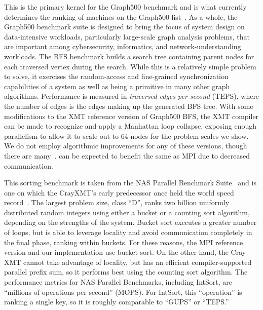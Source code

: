 \vspace{0.5ex}
 This is the primary kernel for the
Graph500 benchmark and is what currently determines the ranking of machines on
the Graph500 list~\cite{graph500list}. As a whole, the Graph500 benchmark
suite is designed to bring the focus of system design on data-intensive
workloads, particularly large-scale graph analysis problems, that are
important among cybersecurity, informatics, and network-understanding
workloads. The BFS benchmark builds a search tree containing parent nodes for
each traversed vertex during the search. While this is a relatively simple
problem to solve, it exercises the random-access and fine-grained
synchronization capabilities of a system as well as being a primitive in many
other graph algorithms. Performance is measured in \emph{traversed edges per
second\/} (TEPS), where the number of edges is the edges making up the
generated BFS tree. With some modifications to the XMT reference version of Graph500 BFS,
the XMT compiler can be made to recognize and apply a Manhattan loop collapse, exposing enough parallelism to allow it to scale out to 64 nodes for the problem scales we show.
We do not employ algorithmic improvements for any of these versions, though there are
many~\cite{Beamer:Graph500,Yoo:FixedPointGraph500}. \Grappa can be expected to benefit the same as MPI due to decreased communication.

\vspace{0.5ex}
 This sorting benchmark is taken from the NAS Parallel Benchmark Suite~\cite{Bailey91thenas,nas3.3} and is one on which the CrayXMT's early predecessor once held the world speed record~\cite{TeraRecord}. The largest problem size, class ``D'', ranks two billion uniformly distributed random integers using either a bucket or a counting sort algorithm, depending on the strengths of the system. Bucket sort executes a greater number of loops, but is able to leverage locality and avoid communication completely in the final phase, ranking within buckets. For these reasons, the MPI reference version and our \Grappa implementation use bucket sort. On the other hand, the Cray XMT cannot take advantage of locality, but has an efficient compiler-supported parallel prefix sum, so it performs best using the counting sort algorithm.  The performance metrics for NAS Parallel Benchmarks, including IntSort, are ``millions of operations per second'' (MOPS). For IntSort, this ``operation'' is ranking a single key, so it is roughly comparable to ``GUPS'' or ``TEPS.''
 
